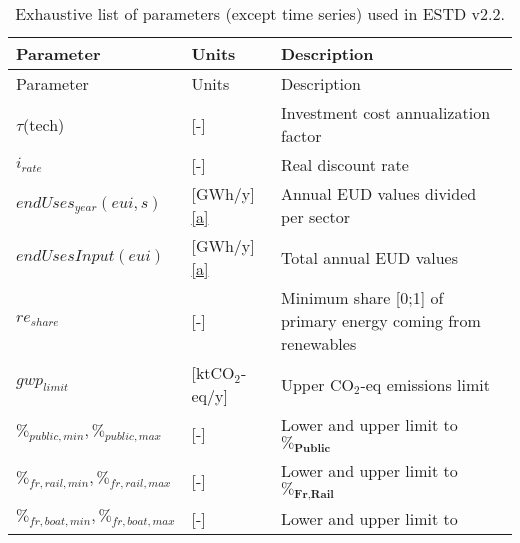 \documentclass[
]{article}
\begin{document}
\begin{longtable}[]{@{}
  >{\raggedright\arraybackslash}p{}
  >{\raggedright\arraybackslash}p{}
  >{\raggedright\arraybackslash}p{}@{}}
\caption{Exhaustive list of parameters (except time series) used in ESTD
v2.2.}\tabularnewline
\toprule\noalign{}
\begin{minipage}[b]{\linewidth}\raggedright
Parameter
\end{minipage} & \begin{minipage}[b]{\linewidth}\raggedright
Units
\end{minipage} & \begin{minipage}[b]{\linewidth}\raggedright
Description
\end{minipage} \\
\midrule\noalign{}
\endfirsthead
\toprule\noalign{}
\begin{minipage}[b]{\linewidth}\raggedright
Parameter
\end{minipage} & \begin{minipage}[b]{\linewidth}\raggedright
Units
\end{minipage} & \begin{minipage}[b]{\linewidth}\raggedright
Description
\end{minipage} \\
\midrule\noalign{}
\endhead
\bottomrule\noalign{}
\endlastfoot
\(\tau\)(tech) & {[}-{]} & Investment cost annualization factor \\
\(i_{rate}\) & {[}-{]} & Real discount rate \\
\(endUses_
{year} (eui,s)\) & {[}GWh/y{]} \hyperref[a]{{[}a{]}} & Annual EUD values
divided per sector \\
\(endUsesInput
(eui)\) & {[}GWh/y{]} \hyperref[a]{{[}a{]}} & Total annual EUD values \\
\(re_{share}\) & {[}-{]} & Minimum share {[}0;1{]} of primary energy
coming from renewables \\
\(gwp
_{limit}\) & {[}ktCO\(_{2}\)-eq/y{]} & Upper CO\(_{2}\)-eq emissions
limit \\
\(\%_
{public,min},
\%_{public,max}\) & {[}-{]} & Lower and upper limit to \(\textbf{\%}_
{\textbf{Public}}\) \\
\(\%_
{fr,rail,min},
\%_{fr,rail,max}\) & {[}-{]} & Lower and upper limit to \(\textbf{\%}_
{\textbf{Fr,Rail}}\) \\
\(\%_
{fr,boat,min},
\%_{fr,boat,max}\) & {[}-{]} & Lower and upper limit to \(\textbf{\%}_

\end{longtable}
\end{document}
